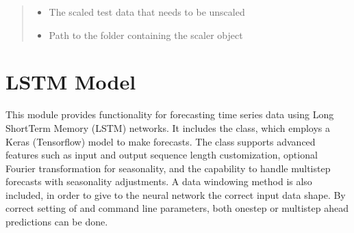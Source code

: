 \documentclass[letterpaper,10pt,english]{sphinxmanual}
\begin{document}
\begin{fulllineitems}
\begin{fulllineitems}
\begin{quote}
\begin{description}
\begin{itemize}
\item {} 
\sphinxAtStartPar
{} \textendash{} The scaled test data that needs to be unscaled

\item {} 
\sphinxAtStartPar
{} \textendash{} Path to the folder containing the scaler object

\end{itemize}

\end{description}\end{quote}

\end{fulllineitems}


\end{fulllineitems}


\sphinxstepscope


\section{LSTM Model}
\label{\detokenize{docs/LSTM_model:lstm-model}}\label{\detokenize{docs/LSTM_model::doc}}
\sphinxAtStartPar
This module provides functionality for forecasting time series data using Long Short\sphinxhyphen{}Term Memory (LSTM) networks.
It includes the  class, which employs a Keras (Tensorflow) model to make forecasts.
The class supports advanced features such as input and output sequence length customization,
optional Fourier transformation for seasonality, and the capability to handle multi\sphinxhyphen{}step forecasts with
seasonality adjustments.
A data windowing method is also included, in order to give to the neural network the correct input data shape. By correct setting of
 and  command line parameters, both one\sphinxhyphen{}step or multi\sphinxhyphen{}step ahead predictions can be done.
\end{document}

